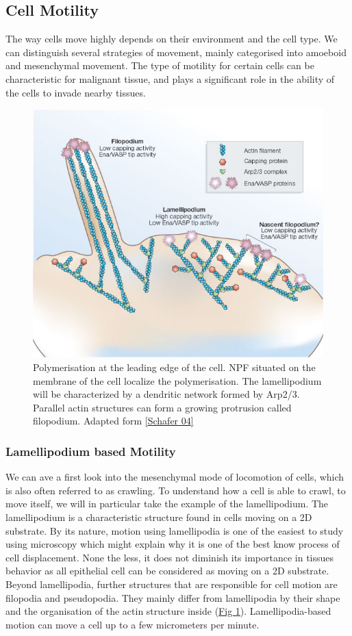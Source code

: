 \documentclass[A4paperpaper,11pt,english]{sphinxmanual}
\begin{document}
\subsection{Cell Motility}
\label{index-latex:cell-motility}
The way cells move highly depends on their environment and the cell type.
We can distinguish several strategies of movement, mainly categorised into
amoeboid and mesenchymal movement. The type of motility for certain
cells can be characteristic for malignant tissue, and plays a significant role in
the ability of the cells to invade nearby tissues.
\begin{figure}[htbp]
\centering
\capstart

\includegraphics[width=0.600\linewidth]{Schafer2004.jpg}
\caption{Polymerisation at the leading edge of the cell. NPF situated on the
membrane of the cell localize the polymerisation. The lamellipodium will be
characterized by a dendritic network formed by Arp2/3. Parallel actin
structures can form a growing protrusion called filopodium.  Adapted form
{\hyperref[index-latex:schafer2004]{{[}Schafer 04{]}}}}\label{index-latex:fig-schafer}\end{figure}


\subsubsection{Lamellipodium based Motility}
\label{index-latex:lamellipodium-based-motility}
We can ave a first look into the mesenchymal mode of locomotion of cells, which is
also often referred to as crawling. To understand how a cell is able to crawl,
to move itself, we will in particular take the example of the lamellipodium.
The lamellipodium is a characteristic structure found in cells moving on a 2D substrate. By
its nature, motion using lamellipodia is one of the easiest to study using
microscopy which might explain why it is one of the best know process of cell
displacement. None the less, it does not diminish its importance in tissues
behavior as all epithelial cell can be considered as moving on a 2D substrate.
Beyond lamellipodia, further structures that are responsible for cell motion are
filopodia and pseudopodia. They mainly differ from lamellipodia by their shape
and the organisation of the actin structure inside (\hyperref[index-latex:fig-schafer]{Fig  \ref*{index-latex:fig-schafer}}). Lamellipodia-based motion
can move a cell up to a few micrometers per minute.
\end{document}
